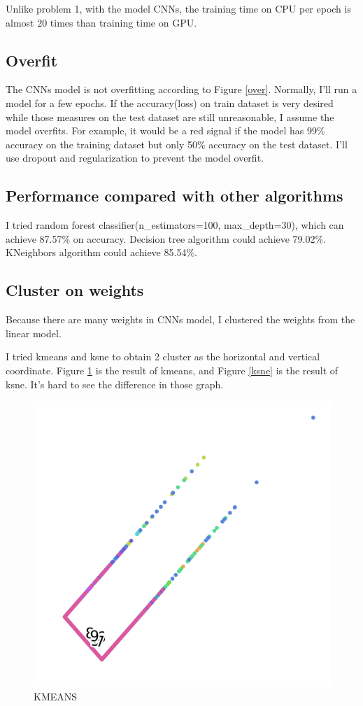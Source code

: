 \documentclass{article}
\begin{document}
Unlike problem 1, with the model CNNs, the training time on CPU per epoch is almost 20 times than training time on GPU. 

\subsection{Overfit}
The CNNs model is not overfitting according to Figure \ref{over}. Normally, I'll run a model for a few epochs. If the accuracy(loss) on train dataset is very desired while those measures on the test dataset are still unreasonable, I assume the model overfits. For example, it would be a red signal if the model has 99\% accuracy on the training dataset but only 50\% accuracy on the test dataset. I'll use dropout and regularization to prevent the model overfit.


\subsection{Performance compared with other algorithms}
I tried random forest classifier(n\_estimators=100, max\_depth=30), which can achieve 87.57\% on accuracy. Decision tree algorithm could achieve 79.02\%. KNeighbors algorithm could achieve 85.54\%.

\subsection{Cluster on weights}
Because there are many weights in CNNs model, I clustered the weights from the linear model.

I tried kmeans and ksne to obtain 2 cluster as the horizontal and vertical coordinate. Figure \ref{kmean} is the result of kmeans, and Figure \ref{ksne} is the result of ksne. It's hard to see the difference in those graph.

\begin{figure}[!h]
  \centering
  \includegraphics[scale=0.5]{imgs/kmeans.png}
  \caption{KMEANS}
  \label{kmean}
\end{figure}
\end{document}
